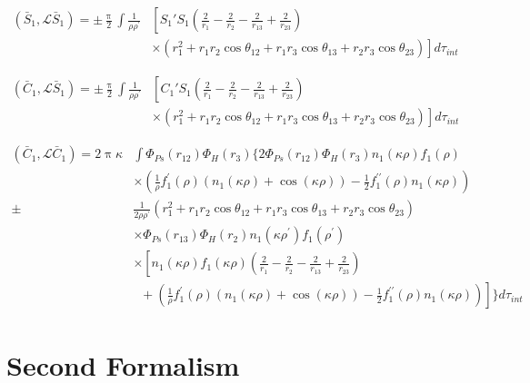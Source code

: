 \documentclass[Dissertation.tex]{subfiles}
\begin{document}
\begin{align}
\label{eq:PWaveSBarSBar}
\left(\bar{S}_1,\mathcal{L}\bar{S}_1\right) = \pm \frac{\uppi}{2} \int \frac{1}{\rho\rho^\prime} & \left[S_1' S_1 \left(\frac{2}{r_1} - \frac{2}{r_2} - \frac{2}{r_{13}} + \frac{2}{r_{23}} \right) \right.  \nonumber \\
& \left. \times \left(r_1^2 + r_1 r_2 \cos\theta_{12} + r_1 r_3 \cos\theta_{13} + r_2 r_3 \cos\theta_{23} \right) \right] d\tau_{int}
\end{align}

\begin{align}
\label{eq:PWaveCBarSBar}
\left(\bar{C}_1,\mathcal{L}\bar{S}_1\right) = \pm \frac{\uppi}{2} \int \frac{1}{\rho\rho^\prime} & \left[C_1' S_1 \left(\frac{2}{r_1} - \frac{2}{r_2} - \frac{2}{r_{13}} + \frac{2}{r_{23}} \right) \right.  \nonumber \\
& \left. \times \left(r_1^2 + r_1 r_2 \cos\theta_{12} + r_1 r_3 \cos\theta_{13} + r_2 r_3 \cos\theta_{23} \right) \right] d\tau_{int}
\end{align}

\begin{align}
\label{eq:PWaveCBarCBar}
\nonumber \left(\bar{C}_1,\mathcal{L}\bar{C}_1\right) = 2 \uppi \kappa & \int \Phi_{Ps}(r_{12}) \Phi_H(r_3) \Bigg\{ 2 \Phi_{Ps}(r_{12}) \Phi_H(r_3) n_1(\kappa\rho) f_1(\rho) \\
\nonumber & \times \left(\frac{1}{\rho} f_1^\prime(\rho) \left(n_1(\kappa\rho) + \cos(\kappa\rho)\right) - \frac{1}{2} f_1^{\prime\prime}(\rho) n_1(\kappa\rho)\right) \\
\nonumber \pm & \frac{1}{2\rho\rho^\prime} (r_1^2 + r_1 r_2 \cos\theta_{12} + r_1 r_3 \cos\theta_{13} + r_2 r_3 \cos\theta_{23}) \\
\nonumber & \times \Phi_{Ps}(r_{13}) \Phi_H(r_2) n_1(\kappa\rho^\prime) f_1(\rho^\prime) \\
\nonumber & \times \left[ n_1(\kappa\rho) f_1(\kappa\rho) \left(\frac{2}{r_1} - \frac{2}{r_2} - \frac{2}{r_{13}} + \frac{2}{r_{23}} \right) \right. \\
& \; \; + \left. \left(\frac{1}{\rho} f_1^\prime(\rho) \left(n_1(\kappa\rho) + \cos(\kappa\rho)\right) - \frac{1}{2} f_1^{\prime\prime}(\rho)  n_1(\kappa\rho)\right) \right]\Bigg\} d\tau_{int}
\end{align}


\section{Second Formalism}
\label{sec:PWave2Formalism}
\end{document}
